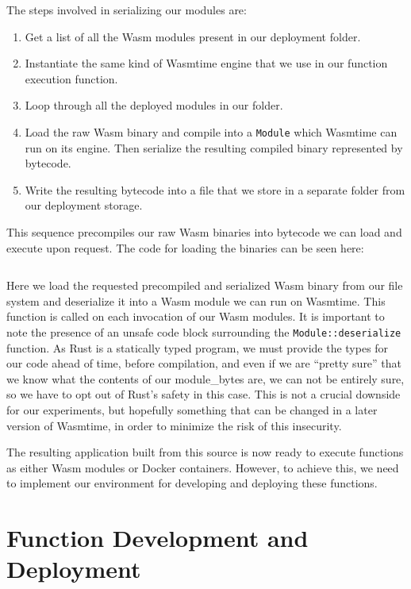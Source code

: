 \documentclass[
  table]{report}
\providecommand{\tightlist}{%
  \setlength{\itemsep}{0pt}\setlength{\parskip}{0pt}}
\begin{document}
\inputminted{rust}{assets/code/serialize_wasm.rs}

The steps involved in serializing our modules are:

\begin{enumerate}
\def\labelenumi{\arabic{enumi}.}
\tightlist
\item
  Get a list of all the \ac{Wasm} modules present in our deployment
  folder.
\item
  Instantiate the same kind of Wasmtime engine that we use in our
  function execution function.
\item
  Loop through all the deployed modules in our folder.
\item
  Load the raw \ac{Wasm} binary and compile into a \texttt{Module} which
  Wasmtime can run on its engine. Then serialize the resulting compiled
  binary represented by bytecode.
\item
  Write the resulting bytecode into a file that we store in a separate
  folder from our deployment storage.
\end{enumerate}

This sequence precompiles our raw \ac{Wasm} binaries into bytecode we
can load and execute upon request. The code for loading the binaries can
be seen here:

\inputminted{rust}{assets/code/load_wasm.rs}

Here we load the requested precompiled and serialized \ac{Wasm} binary
from our file system and deserialize it into a \ac{Wasm} module we can
run on Wasmtime. This function is called on each invocation of our
\ac{Wasm} modules. It is important to note the presence of an unsafe
code block surrounding the \texttt{Module::deserialize} function. As
Rust is a statically typed program, we must provide the types for our
code ahead of time, before compilation, and even if we are ``pretty
sure'' that we know what the contents of our module\_bytes are, we can
not be entirely sure, so we have to opt out of Rust's safety in this
case. This is not a crucial downside for our experiments, but hopefully
something that can be changed in a later version of Wasmtime, in order
to minimize the risk of this insecurity.

The resulting application built from this source is now ready to execute
functions as either \ac{Wasm} modules or Docker containers. However, to
achieve this, we need to implement our environment for developing and
deploying these functions.

\section{Function Development and Deployment}
\end{document}
